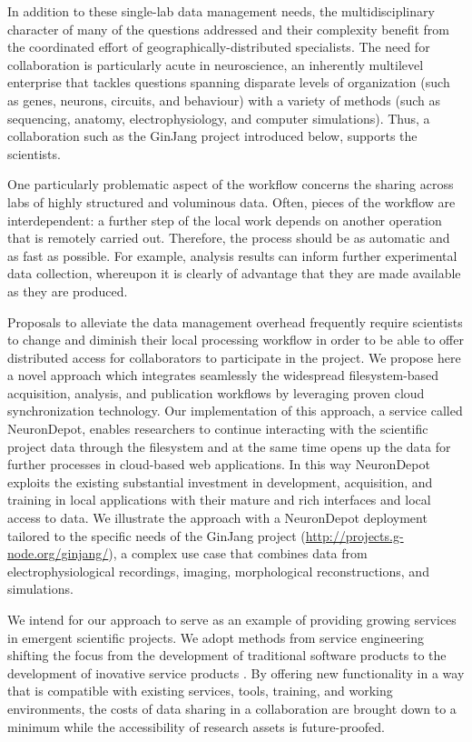 \documentclass{frontiersSCNS} %
\begin{document}
In addition to these single-lab data management needs, the multidisciplinary
character of many of the questions addressed and their complexity benefit from
the coordinated effort of geographically-distributed specialists. The need for
collaboration is particularly acute in neuroscience, an inherently multilevel
enterprise that tackles questions spanning disparate levels of organization
(such as genes, neurons, circuits, and behaviour) with a variety of methods
(such as sequencing, anatomy, electrophysiology, and computer simulations).
Thus, a collaboration such as the GinJang project introduced below, supports
the scientists.

One particularly problematic aspect of the workflow concerns the sharing
across labs of highly structured and voluminous data. Often, pieces of the
workflow are interdependent: a further step of the local work depends on
another operation that is remotely carried out. Therefore, the process should
be as automatic and as fast as possible. For example, analysis results can
inform further experimental data collection, whereupon it is clearly of
advantage that they are made available as they are produced.

Proposals to alleviate the data management overhead frequently require
scientists to change and diminish their local processing workflow in order to
be able to offer distributed access for collaborators to participate in the
project. We propose here a novel approach which integrates seamlessly the
widespread filesystem-based acquisition, analysis, and publication workflows by
leveraging proven cloud synchronization technology. Our implementation of this
approach, a service called NeuronDepot, enables researchers to continue
interacting with the scientific project data through the filesystem and at the
same time opens up the data for further processes in cloud-based web
applications. In this way NeuronDepot exploits the existing substantial
investment in development, acquisition, and training in local applications with
their mature and rich interfaces and local access to data. We illustrate the
approach with a NeuronDepot deployment tailored to the specific needs of the
GinJang project (\url{http://projects.g-node.org/ginjang/}), a complex use case that
combines data from electrophysiological recordings, imaging, morphological
reconstructions, and simulations.

We intend for our approach to serve as an example of providing growing services
in emergent scientific projects. We adopt methods from service engineering
shifting the focus from the development of traditional software products to the
development of inovative service products \citep{truex_growing_1999,
bennett_service-based_2000, bullinger_service_2003}. By offering new
functionality in a way that is compatible with existing services, tools,
training, and working environments, the costs of data sharing in a
collaboration are brought down to a minimum while the accessibility of research
assets is future-proofed.
\end{document}
